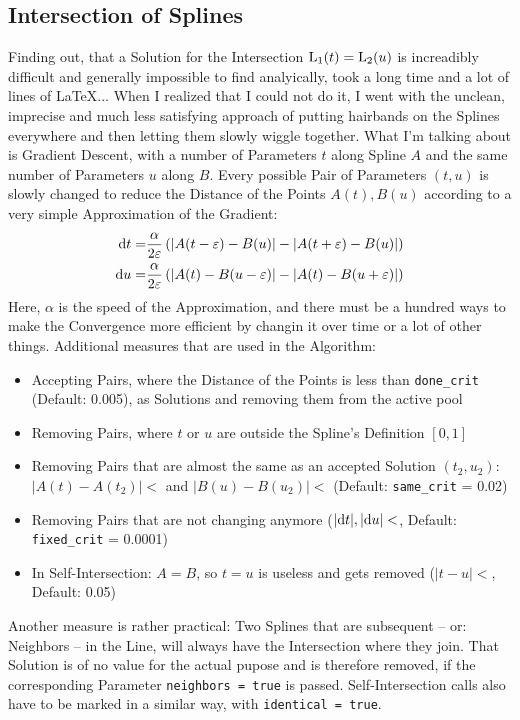\subsection{Intersection of Splines}
    Finding out, that a Solution for the Intersection $\operatorname{L}_1(t) = \operatorname{L}_2(u)$ is increadibly difficult and generally impossible to find analyically, took a long time and a lot of lines of \LaTeX... When I realized that I could not do it, I went with the unclean, imprecise and much less satisfying approach of putting hairbands on the Splines everywhere and then letting them slowly wiggle together.
    What I'm talking about is Gradient Descent, with a number of Parameters $t$ along Spline $A$ and the same number of Parameters $u$ along $B$. Every possible Pair of Parameters $(t, u)$ is slowly changed to reduce the Distance of the Points $A(t), B(u)$ according to a very simple Approximation of the Gradient:
    $$\begin{aligned}
        {\rm d}{}t =& \frac{\alpha}{2\varepsilon} \left(\left|A(t-\varepsilon) - B(u)\right| - \left|A(t+\varepsilon) - B(u)\right|\right)\\
        {\rm d}{}u =& \frac{\alpha}{2\varepsilon} \left(\left|A(t) - B(u-\varepsilon)\right| - \left|A(t) - B(u+\varepsilon)\right|\right) \\
    \end{aligned}$$
    Here, $\alpha$ is the speed of the Approximation, and there must be a hundred ways to make the Convergence more efficient by changin it over time or a lot of other things. Additional measures that are used in the Algorithm:
    \begin{itemize}
        \item Accepting Pairs, where the Distance of the Points is less than {\tt done\_crit} (Default: 0.005), as Solutions and removing them from the active pool
        \item Removing Pairs, where $t$ or $u$ are outside the Spline's Definition $[0, 1]$
        \item Removing Pairs that are almost the same as an accepted Solution $(t_2, u_2)$: $|A(t) - A(t_2)| < $\phantom{.}{\tt same\_crit} and $|B(u) - B(u_2)| < $\phantom{.}{\tt same\_crit} (Default: {\tt same\_crit} = 0.02)
        \item Removing Pairs that are not changing anymore ($|{\rm d}{}t|, |{\rm d}{}u| < $\phantom{.}{\tt fixed\_crit}, Default: {\tt fixed\_crit} = 0.0001)
        \item In Self-Intersection: $A = B$, so $t = u$ is useless and gets removed ($|t - u| < $\phantom{.}{\tt identical\_crit}, Default: 0.05)
    \end{itemize}
    Another measure is rather practical: Two Splines that are subsequent – or: Neighbors – in the Line, will always have the Intersection where they join. That Solution is of no value for the actual pupose and is therefore removed, if the corresponding Parameter {\tt neighbors = true} is passed. Self-Intersection calls also have to be marked in a similar way, with {\tt identical = true}.
